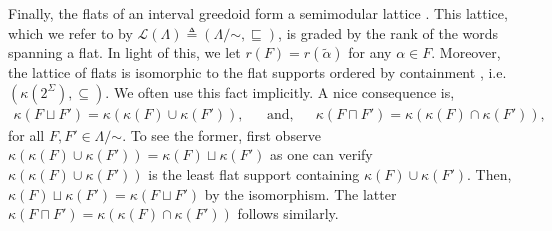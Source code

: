 \documentclass[11pt]{article}
\newcommand{\univ}{\Sigma}
\newcommand{\glang}{\Lambda}
\newcommand{\rank}{r}
\providecommand{\L}{}
\renewcommand{\L}{\mathscr{L}}
\begin{document}
Finally, the flats of an interval greedoid form a semimodular lattice \cite{korte2012greedoids}.
This lattice, which we refer to by $\L(\glang)\triangleq (\glang/\mathord{\sim},\sqsubseteq)$, is graded by the rank of the words spanning a flat.
In light of this, we let $r(F) = r(\widetilde{\alpha})$ for any $\alpha \in F$.
Moreover, the lattice of flats is isomorphic to the flat supports ordered by containment \cite{korte2012greedoids}, i.e. $\left(\kappa\left(2^\univ\right),\subseteq\right)$.
We often use this fact implicitly.
A nice consequence is,
\begin{align*}
    \kappa(F\sqcup F') = \kappa(\kappa(F)\cup \kappa(F')),&&\text{and},&&\kappa(F\sqcap F') = \kappa(\kappa(F)\cap\kappa(F')),
\end{align*}
for all $F,F'\in\glang/\mathord{\sim}$.
To see the former, first observe $\kappa(\kappa(F)\cup\kappa(F')) = \kappa(F)\sqcup \kappa(F')$ as one can verify $\kappa(\kappa(F)\cup\kappa(F'))$ is the least flat support containing $\kappa(F)\cup\kappa(F')$.
Then, $\kappa(F)\sqcup\kappa(F') = \kappa(F\sqcup F')$ by the isomorphism.
The latter $\kappa(F\sqcap F') = \kappa(\kappa(F)\cap\kappa(F'))$ follows similarly.

\iffalse
\[
[\alpha] \cdot x \triangleq \begin{cases}
    [\alpha x],\quad&\text{if }\rho(\widetilde{\alpha} + x) > \rho(\widetilde{\alpha}),\\
    [\alpha],\quad&\text{otherwise}.
\end{cases}
\]
\[
    F \sqsubset F' \iff (\exists \gamma \in \univ^*)\; F\cdot \gamma = F'.
\]
\fi
\end{document}
